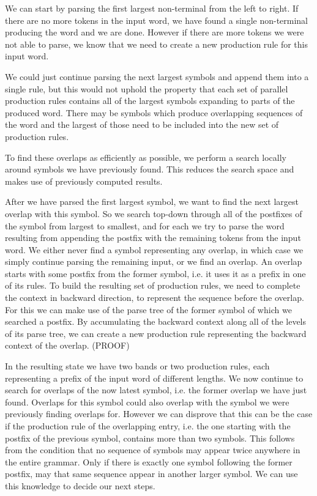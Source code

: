 We can start by parsing the first largest non-terminal from the left to right.
If there are no more tokens in the input word, we have found a single non-terminal
producing the word and we are done. However if there are more tokens we were
not able to parse, we know that we need to create a new production rule for this input word.

We could just continue parsing the next largest symbols and append them into a single rule,
but this would not uphold the property that each set of parallel production rules contains all of the
largest symbols expanding to parts of the produced word. There may be symbols which produce overlapping
sequences of the word and the largest of those need to be included into the new set of production rules.

To find these overlaps as efficiently as possible, we perform a search locally around symbols we have
previously found. This reduces the search space and makes use of previously computed results.

After we have parsed the first largest symbol, we want to find the next largest overlap with this symbol.
So we search top-down through all of the postfixes of the symbol from largest to smallest, and for each
we try to parse the word resulting from appending the postfix with the remaining tokens from the input word.
We either never find a symbol representing any overlap, in which case we simply continue parsing the remaining input,
or we find an overlap. An overlap starts with some postfix from the former symbol, i.e. it
uses it as a prefix in one of its rules. To build the resulting set of production rules, we need to complete the
context in backward direction, to represent the sequence before the overlap. For this we can make use of the parse
tree of the former symbol of which we searched a postfix. By accumulating the backward context along all of the
levels of its parse tree, we can create a new production rule representing the backward context of the overlap. (PROOF)

In the resulting state we have two bands or two production rules, each representing a prefix of the input word of
different lengths. We now continue to search for overlaps of the now latest symbol, i.e. the former overlap we have
just found. Overlaps for this symbol could also overlap with the symbol we were previously finding overlaps for.
However we can disprove that this can be the case if the production rule of the overlapping entry, i.e. the one
starting with the postfix of the previous symbol, contains more than two symbols. This follows from the condition 
that no sequence of symbols may appear twice anywhere in the entire grammar. Only if there is exactly one symbol 
following the former postfix, may that same sequence appear in another larger symbol. We can use this knowledge to 
decide our next steps.

